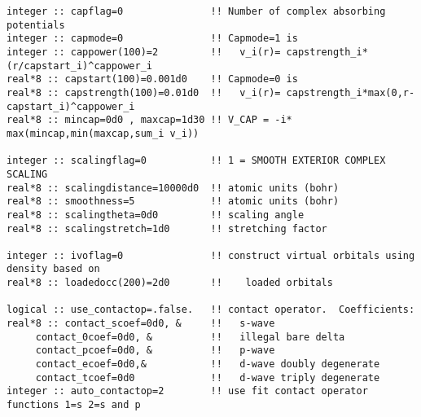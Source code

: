 \begin{verbatim}
integer :: capflag=0               !! Number of complex absorbing potentials
integer :: capmode=0               !! Capmode=1 is 
integer :: cappower(100)=2         !!   v_i(r)= capstrength_i*(r/capstart_i)^cappower_i
real*8 :: capstart(100)=0.001d0    !! Capmode=0 is    
real*8 :: capstrength(100)=0.01d0  !!   v_i(r)= capstrength_i*max(0,r-capstart_i)^cappower_i
real*8 :: mincap=0d0 , maxcap=1d30 !! V_CAP = -i* max(mincap,min(maxcap,sum_i v_i))

integer :: scalingflag=0           !! 1 = SMOOTH EXTERIOR COMPLEX SCALING
real*8 :: scalingdistance=10000d0  !! atomic units (bohr)
real*8 :: smoothness=5             !! atomic units (bohr)
real*8 :: scalingtheta=0d0         !! scaling angle
real*8 :: scalingstretch=1d0       !! stretching factor

integer :: ivoflag=0               !! construct virtual orbitals using density based on 
real*8 :: loadedocc(200)=2d0       !!    loaded orbitals

logical :: use_contactop=.false.   !! contact operator.  Coefficients:
real*8 :: contact_scoef=0d0, &     !!   s-wave
     contact_0coef=0d0, &          !!   illegal bare delta
     contact_pcoef=0d0, &          !!   p-wave
     contact_ecoef=0d0,&           !!   d-wave doubly degenerate
     contact_tcoef=0d0             !!   d-wave triply degenerate
integer :: auto_contactop=2        !! use fit contact operator functions 1=s 2=s and p
\end{verbatim}
